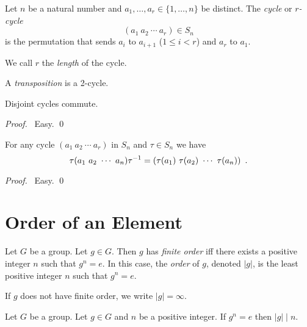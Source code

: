 \begin{df}
Let $n$ be a natural number and $a_1, \ldots, a_r \in \{ 1, \ldots, n \}$ be distinct. The \emph{cycle} or \emph{$r$-cycle}
\[ (a_1 \ a_2 \ \cdots\ a_r) \in S_n \]
is the permutation that sends $a_i$ to $a_{i+1}$ ($1 \leq i < r$) and $a_r$ to $a_1$.

We call $r$ the \emph{length} of the cycle.

A \emph{transposition} is a 2-cycle.
\end{df}

\begin{prop}
Disjoint cycles commute.
\end{prop}

\begin{proof}
\pf\ Easy. \qed
\end{proof}

\begin{prop}
For any cycle $(a_1\ a_2\ \cdots\ a_r)$ in $S_n$ and $\tau \in S_n$ we have
\[ \tau (a_1\ a_2\ \cdots\ a_n) {\tau}^{-1} = (\tau(a_1)\ \tau(a_2)\ \cdots\ \tau(a_n)) \enspace . \]
\end{prop}

\begin{proof}
\pf\ Easy. \qed
\end{proof}

\section{Order of an Element}

\begin{df}[Order]
    Let $G$ be a group. Let $g \in G$. Then $g$ has \emph{finite order} iff there exists a positive integer $n$ such that $g^n = e$. In this case, the \emph{order} of $g$, denoted $|g|$, is the least positive integer $n$ such that $g^n = e$.

    If $g$ does not have finite order, we write $|g| = \infty$.
\end{df}

\begin{prop}
    Let $G$ be a group. Let $g \in G$ and $n$ be a positive integer. If $g^n = e$ then $|g| \mid n$.
\end{prop}

